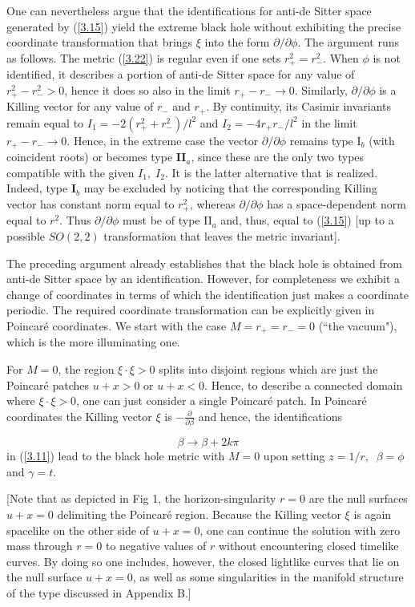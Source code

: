\documentclass[12pt]{article}
\newcounter{c1} \newcounter{c2}
\newcommand{\bb}{\begin{equation}}
\newcommand{\ee}{\end{equation}}
\newcommand{\p}{\partial}
\begin{document}
One can nevertheless argue that the identifications for anti-de
Sitter space generated by (\ref{3.15}) yield the extreme black
hole without exhibiting the precise coordinate transformation
that brings $\xi$ into the form $\p /\p \phi$. The argument runs
as follows.  The metric (\ref{3.22}) is regular even if one sets
$r_{+}^2 = r_{-}^2$. When $\phi$ is not identified, it describes
a portion of anti-de Sitter space for any value of $r_{+}^2 -
r_{-}^2 >0$, hence it does so also in the limit $r_+-r_-
\rightarrow 0$.  Similarly, $\p /\p \phi$ is a Killing vector
for any value of $r_{-}$ and $r_{+}$.  By continuity, its Casimir
invariants remain equal to $I_1= -2(r_{+}^2 +r_{-}^2)/l^2$ and
$I_2= - 4r_{+}r_{-}/l^2$ in the limit $r_{+} - r_{-} \rightarrow
0$. Hence, in the extreme case the vector $\p /\p \phi$ remains
type I$_b$ (with coincident roots) or becomes type {\bf
II}$_a$, since these are the only two types compatible with the
given $I_1,\; I_2$. It is the latter alternative that is
realized. Indeed, type {\bf I}$_b$ may be excluded by noticing
that the corresponding Killing vector has constant norm equal to
$r_{+}^2$, whereas $\p /\p \phi$ has a space-dependent norm
equal to $r^2$. Thus $\p /\p \phi$ must be of type II$_a$ and,
thus, equal to (\ref{3.15}) [up to a possible $SO(2,2)$
transformation that leaves the metric invariant].

The preceding argument already establishes that the black hole
is obtained from anti-de Sitter space by an identification.
However, for completeness we exhibit a change of coordinates
in terms of which the identification just makes a coordinate
periodic.  The required coordinate transformation can be
explicitly given in Poincar\'e coordinates. We start with the
case $M= r_{+}=r_{-}=0$ (``the vacuum"), which is the more
illuminating one.

For $M=0$, the region $\xi \cdot \xi >0$ splits  into disjoint
regions which are just the Poincar\'e patches $u+x>0$ or
$u+x<0$. Hence, to describe a connected domain where $\xi \cdot
\xi >0$, one can just consider a single Poincar\'e patch. In
Poincar\'e coordinates the Killing vector $\xi$ is  $ -\frac{\p}{\p
\beta}$ and hence, the identifications

\bb
\beta \rightarrow \beta + 2k\pi
\label{3.24}
\ee
%
in (\ref{3.11}) lead to the black hole metric with $M=0$ upon
setting $z=1/r,\;\; \beta=\phi$ and $\gamma =t$.

[Note that as depicted in Fig 1, the horizon-singularity $r=0$ are the null
 surfaces $u+x=0$
delimiting the Poincar\'e region. Because the Killing vector
$\xi$ is again spacelike on the other side of $u+x=0$, one can
continue the solution with zero mass through $r=0$ to negative
values of $r$ without encountering closed timelike curves. By
doing so one includes, however, the closed lightlike curves that
lie on the null surface $u+x=0$, as well as some singularities
in the manifold structure of the type discussed in Appendix B.]
\end{document}
